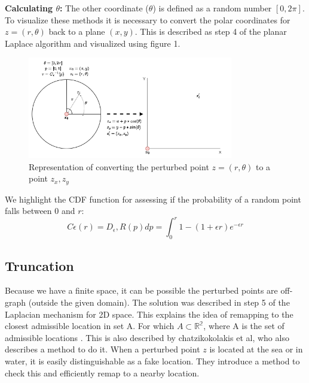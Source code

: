 \textbf{Calculating $\theta$:}
The other coordinate ($\theta$) is defined as a random number $[0, 2\pi]$. \newline \newline
To visualize these methods it is necessary to convert the polar coordinates for $z = (r, \theta)$ back to a plane $(x, y)$.
This is described as step 4 of the planar Laplace algorithm \citep{DBLP:journals/corr/abs-1212-1984} and visualized using figure 1.
\begin{figure}[h]
  \includegraphics[width=0.8\textwidth]{TheorethicalFramework/ND-Laplace/Images/polar-laplace-to-planar.png}
  \centering
  \caption{Representation of converting the perturbed point $z = (r, \theta)$ to a point ${z_x, z_y}$}
\end{figure}

We highlight the CDF function  for assessing if the probability of a random point falls between 0 and $r$:
\begin{equation}
  C{\epsilon}(r) = D_\epsilon,R(p)dp = \int_{0}^{r} 1 - (1 + \epsilon r ) e^{-\epsilon r}
\end{equation}

\newpage
\subsection{Truncation} \label{theory:truncation}
Because we have a finite space, it can be possible the perturbed points are off-graph (outside the given domain).
The solution was described in step 5 of the Laplacian mechanism for 2D space. This explains the idea of remapping to the closest admissible location in set A.
For which $A \subset \mathbb{R^2}$, where A is the set of admissible locations \citep{DBLP:journals/corr/abs-1212-1984}.
This is also described by chatzikokolakis et al, who also describes a method to do it.
When a perturbed point $z$ is located at the sea or in water, it is easily distinguishable as a fake location.
They introduce a method to check this and efficiently remap to a nearby location.

